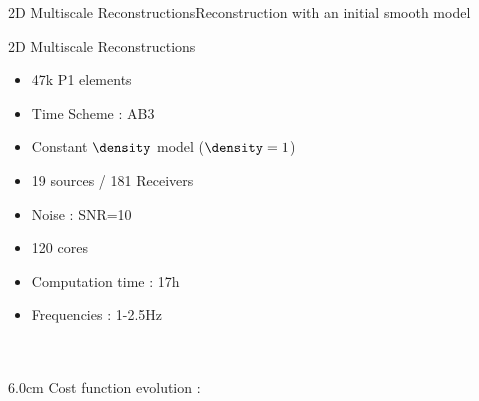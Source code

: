 \begin{frame}[noframenumbering]{2D Multiscale Reconstructions}{Reconstruction with an initial smooth model}
  \vspace{-0.3cm}
  \renewcommand{\modelfile}{fig/marmousi_filter_5}
  \renewcommand{\modeltitle}{Reconstructed $\velocity$ Model with \textcolor{red}{1.0-15Hz} filter}
  \begin{figure}
        \hfill
  \end{figure}
  \vspace{-1.3cm}
  \renewcommand{\modeltitle}{Target $\velocity$ Model}
  \renewcommand{\modelfile}{fig/marmousi_target}
  \begin{figure}
        \hfill
   \end{figure}
\end{frame}




\begin{frame}{2D Multiscale Reconstructions}

  \begin{multicols}{2}
    \begin{itemize}
    \item 47k P1 elements
    \item Time Scheme : AB3
    \item Constant $\density$ model ($\density=1$)
    \item 19 sources / 181 Receivers
    \item Noise : SNR=10
    \item 120 cores
    \item Computation time : 17h
    \item Frequencies : \textcolor{pink!60!black}{1-2.5Hz} \\ ~ \\ ~
    \end{itemize}
    \columnbreak

    \setlength{\plotwidth} {6.0cm}
    \setlength{\plotheight}{5cm}
    Cost function evolution :
    \begin{figure}
    \end{figure}
  \end{multicols}
\end{frame}

